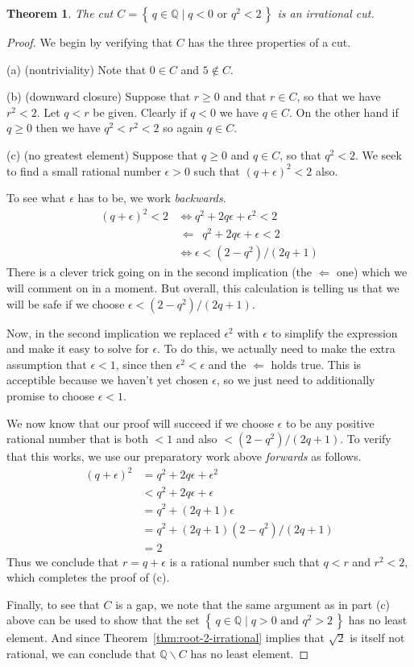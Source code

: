 \documentclass[11pt,oneside]{amsbook}
\newcommand{\set}[1]{\left\{\,#1\,\right\}}
\newcommand{\QQ}{\mathbb Q}
\renewcommand{\setminus}{\smallsetminus}
\theoremstyle{definition}
\theoremstyle{plain}
\newtheorem{thm}{Theorem}[section]
\theoremstyle{definition}
\theoremstyle{remark}
\numberwithin{equation}{section}
\numberwithin{figure}{section}
\begin{document}
\begin{thm}
  \label{thm:root-2-cut}
  The cut $C=\set{q\in\QQ\mid q<0\text{ or }q^2<2}$ is an irrational cut.
\end{thm}

\begin{proof}
  We begin by verifying that $C$ has the three properties of a cut.

  (a) (nontriviality) Note that $0\in C$ and $5\notin C$.

  (b) (downward closure) Suppose that $r\geq0$ and that $r\in C$, so that we have $r^2<2$. Let $q<r$ be given. Clearly if $q<0$ we have $q\in C$. On the other hand if $q\geq0$ then we have $q^2<r^2<2$ so again $q\in C$.

  (c) (no greatest element) Suppose that $q\geq0$ and $q\in C$, so that $q^2<2$. We seek to find a small rational number $\epsilon>0$ such that $(q+\epsilon)^2<2$ also.

  To see what $\epsilon$ has to be, we work \emph{backwards}.
  \begin{align*}
    (q+\epsilon)^2<2&\iff q^2+2q\epsilon+\epsilon^2<2\\
    &\,\Longleftarrow\,\,\, q^2+2q\epsilon+\epsilon<2\\
    &\iff \epsilon<(2-q^2)/(2q+1)
  \end{align*}
  There is a clever trick going on in the second implication (the $\Longleftarrow$ one) which we will comment on in a moment. But overall, this calculation is telling us that we will be safe if we choose $\epsilon<(2-q^2)/(2q+1)$.

  Now, in the second implication we replaced $\epsilon^2$ with $\epsilon$ to simplify the expression and make it easy to solve for $\epsilon$. To do this, we actually need to make the extra assumption that $\epsilon<1$, since then $\epsilon^2<\epsilon$ and the $\Longleftarrow$ holds true. This is acceptible because we haven't yet chosen $\epsilon$, so we just need to additionally promise to choose $\epsilon<1$.

  We now know that our proof will succeed if we choose $\epsilon$ to be any positive rational number that is both $<1$ and also $<(2-q^2)/(2q+1)$. To verify that this works, we use our preparatory work above \emph{forwards} as follows.
  \begin{align*}
    (q+\epsilon)^2&=q^2+2q\epsilon+\epsilon^2\\
    &<q^2+2q\epsilon+\epsilon\\
    &=q^2+(2q+1)\epsilon\\
    &=q^2+(2q+1)(2-q^2)/(2q+1)\\
    &=2
  \end{align*}
  Thus we conclude that $r=q+\epsilon$ is a rational number such that $q<r$ and $r^2<2$, which completes the proof of (c).

  Finally, to see that $C$ is a gap, we note that the same argument as in part (c) above can be used to show that the set $\set{q\in\QQ\mid q>0\text{ and }q^2>2}$ has no least element. And since Theorem~\ref{thm:root-2-irrational} implies that $\sqrt2$ is itself not rational, we can conclude that $\QQ\setminus C$ has no least element.
\end{proof}
\end{document}
